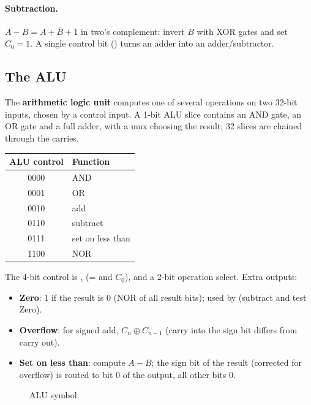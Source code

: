 \paragraph{Subtraction.} $A - B = A + \overline{B} + 1$ in two's complement:
invert $B$ with XOR gates and set $C_0 = 1$. A single control bit
() turns an adder into an adder/subtractor.

\subsection{The ALU}

The \textbf{arithmetic logic unit} computes one of several operations on two
32-bit inputs, chosen by a control input. A 1-bit ALU slice contains an AND
gate, an OR gate and a full adder, with a mux choosing the result;
32 slices are chained through the carries.

\begin{center}
\begin{tabular}{cl}
\toprule
ALU control & Function \\
\midrule
0000 & AND \\
0001 & OR \\
0010 & add \\
0110 & subtract \\
0111 & set on less than \\
1100 & NOR \\
\bottomrule
\end{tabular}
\end{center}
The 4-bit control is ,  (=  and
$C_0$), and a 2-bit operation select. Extra outputs:
\begin{itemize}
  \item \textbf{Zero}: 1 if the result is 0 (NOR of all result bits); used
    by  (subtract and test Zero).
  \item \textbf{Overflow}: for signed add, $C_{n} \oplus C_{n-1}$ (carry into
    the sign bit differs from carry out).
  \item \textbf{Set on less than}: compute $A - B$; the sign bit of the
    result (corrected for overflow) is routed to bit 0 of the output, all
    other bits 0.
\end{itemize}

\begin{figure}[H]
\centering
{}
\caption{ALU symbol.}
\end{figure}


